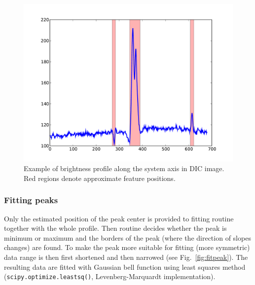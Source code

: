 \documentclass[a4paper,12pt]{article}
\begin{document}
\begin{figure}%
\includegraphics[width=\columnwidth]{figs/dicaxisprofile.pdf}%
\caption{Example of brightness profile along the system axis in DIC image. Red regions denote approximate feature positions.}%
\label{fig:dicaxisprofile}%
\end{figure}

\subsubsection{Fitting peaks}\label{fitpeak}

Only the estimated position of the peak center is provided to fitting routine together with the whole profile. Then routine decides whether the peak is minimum or maximum and the borders of the peak (where the direction of slopes changes) are found. To make the peak more suitable for fitting (more symmetric) data range is then first shortened and then narrowed (see Fig.~\ref{fig:fitpeak}). The resulting data are fitted with Gaussian bell function using least squares method (\verb|scipy.optimize.leastsq()|, Levenberg-Marquardt implementation).
\end{document}
